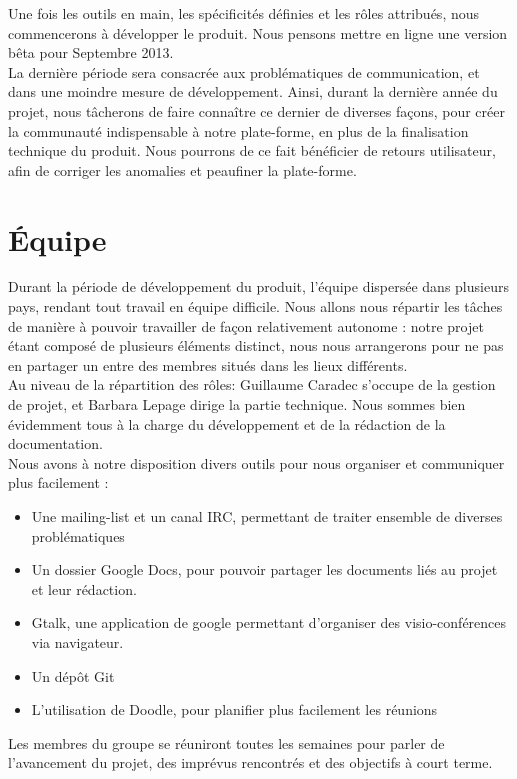 \documentclass{life-fr}
\begin{document}
Une fois les outils en main, les spécificités définies et les rôles attribués, nous commencerons à développer le produit. Nous pensons mettre en ligne une version bêta pour Septembre 2013.\\

La dernière période sera consacrée aux problématiques de communication, et dans une moindre mesure de développement. Ainsi, durant la dernière année du projet, nous tâcherons de faire connaître ce dernier de diverses façons, pour créer la communauté indispensable à notre plate-forme, en plus de la finalisation technique du produit. Nous pourrons de ce fait bénéficier de retours utilisateur, afin de corriger les anomalies et peaufiner la plate-forme.

\section{Équipe}

Durant la période de développement du produit, l'équipe dispersée dans plusieurs pays, rendant tout travail en équipe difficile. Nous allons nous répartir les tâches de manière à pouvoir travailler de façon relativement autonome : notre projet étant composé de plusieurs éléments distinct, nous nous arrangerons pour ne pas en partager un entre des membres situés dans les lieux différents.\\

Au niveau de la répartition des rôles: Guillaume Caradec s'occupe de la gestion de projet, et Barbara Lepage dirige la partie technique. Nous sommes bien évidemment tous à la charge du développement et de la rédaction de la documentation.\\

Nous avons à notre disposition divers outils pour nous organiser et communiquer plus facilement :\\

\begin{itemize}
  \item Une mailing-list et un canal IRC, permettant de traiter ensemble de diverses problématiques
  \item Un dossier Google Docs, pour pouvoir partager les documents liés au projet et leur rédaction.
  \item Gtalk, une application de google permettant d'organiser des visio-conférences via navigateur.
  \item Un dépôt Git
  \item L'utilisation de Doodle, pour planifier plus facilement les réunions
\end{itemize}

Les membres du groupe se réuniront toutes les semaines pour parler de l'avancement du projet, des imprévus rencontrés et des objectifs à court terme.
\end{document}
